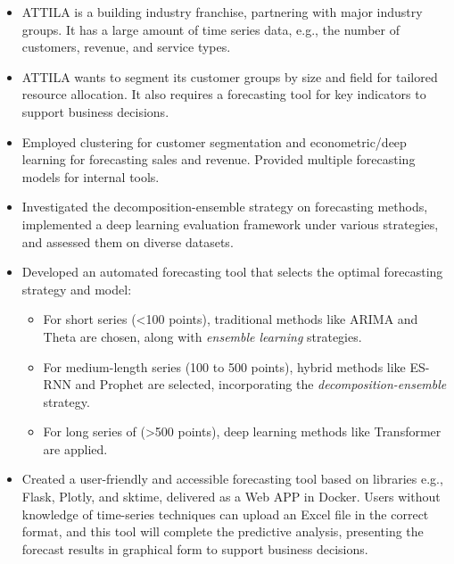 \documentclass{mycv}
\begin{document}
\begin{itemize}
  \itemsep 0.3em
  \item ATTILA is a building industry franchise, partnering with major industry groups. It has a large amount of time series data, e.g., the number of customers, revenue, and service types.
  \item ATTILA wants to segment its customer groups by size and field for tailored resource allocation. It also requires a forecasting tool for key indicators to support business decisions.
  \item Employed clustering for customer segmentation and econometric/deep learning for forecasting sales and revenue. Provided multiple forecasting models for internal tools.
  \item Investigated the decomposition-ensemble strategy on forecasting methods, implemented a deep learning evaluation framework under various strategies, and assessed them on diverse datasets.
  \item Developed an automated forecasting tool that selects the optimal forecasting strategy and model:
  \begin{itemize}
    \item For short series (<100 points), traditional methods like ARIMA and Theta are chosen, along with \textit{ensemble learning} strategies.
    \item For medium-length series (100 to 500 points), hybrid methods like ES-RNN and Prophet are selected, incorporating the \textit{decomposition-ensemble} strategy.
    \item For long series of (>500 points), deep learning methods like Transformer are applied.
  \end{itemize}
  \item Created a user-friendly and accessible forecasting tool based on libraries e.g., Flask, Plotly, and sktime, delivered as a Web APP in Docker. Users without knowledge of time-series techniques can upload an Excel file in the correct format, and this tool will complete the predictive analysis, presenting the forecast results in graphical form to support business decisions.
\end{itemize}
\end{document}

